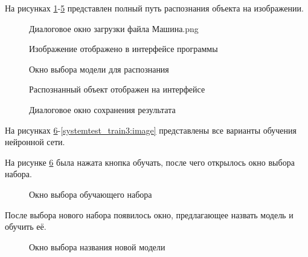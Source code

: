 На рисунках \ref{systemtest_responce:image}-\ref{systemtest_responce4:image} представлен полный путь распознания объекта на изображении.

\begin{figure}[H]
\caption{Диалоговое окно загрузки файла Машина.png}
\label{systemtest_responce:image}
\end{figure}

\begin{figure}[H]
\caption{Изображение отображено в интерфейсе программы}
\label{systemtest_responce1:image}
\end{figure}

\begin{figure}[H]
\caption{Окно выбора модели для распознания}
\label{systemtest_responce2:image}
\end{figure}

\begin{figure}[H]
\caption{Распознанный объект отображен на интерфейсе}
\label{systemtest_responce3:image}
\end{figure}

\begin{figure}[H]
\caption{Диалоговое окно сохранения результата}
\label{systemtest_responce4:image}
\end{figure}

На рисунках \ref{systemtest_train1:image}-\ref{systemtest_train3:image} представлены все варианты обучения нейронной сети.

На рисунке \ref{systemtest_train1:image} была нажата кнопка обучать, после чего открылось окно выбора набора.

\begin{figure}[H]
\caption{Окно выбора обучающего набора}
\label{systemtest_train1:image}
\end{figure}

После выбора нового набора появилось окно, предлагающее назвать модель и обучить её.

\begin{figure}[H]
\caption{Окно выбора названия новой модели}
\label{systemtest_train2:image}
\end{figure}

